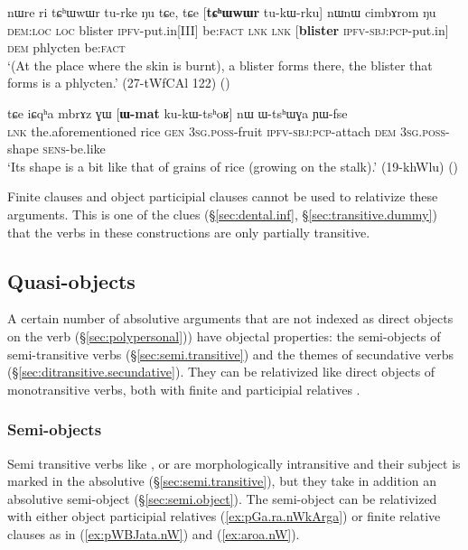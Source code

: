 \begin{exe}
\ex \label{ex:tCHWwWr.turke}
\gll nɯre ri tɕʰɯwɯr tu-rke ŋu tɕe, tɕe [\textbf{tɕʰɯwɯr} tu-kɯ-rku] nɯnɯ cimbɤrom ŋu \\
\textsc{dem}:\textsc{loc} \textsc{loc} blister \textsc{ipfv}-put.in[III] be:\textsc{fact} \textsc{lnk} \textsc{lnk} [\textbf{blister} \textsc{ipfv}-\textsc{sbj}:\textsc{pcp}-put.in] \textsc{dem} phlycten be:\textsc{fact} \\
\glt `(At the place where the skin is burnt), a blister forms there, the blister that forms is a phlycten.' (27-tWfCAl 122)
()
\end{exe} 

\begin{exe}
\ex \label{ex:Wmat.kukWtshoR}
\gll tɕe iɕqʰa mbrɤz ɣɯ [\textbf{ɯ-mat} ku-kɯ-tsʰoʁ] nɯ ɯ-tsʰɯɣa ɲɯ-fse \\
\textsc{lnk} the.aforementioned rice \textsc{gen} \textsc{3sg}.\textsc{poss}-fruit \textsc{ipfv}-\textsc{sbj}:\textsc{pcp}-attach \textsc{dem} \textsc{3sg}.\textsc{poss}-shape \textsc{sens}-be.like \\
\glt `Its shape is a bit like that of grains of rice (growing on the stalk).' (19-khWlu)
()
\end{exe}

Finite clauses and object participial clauses cannot be used to relativize these arguments. This is one of the clues (§\ref{sec:dental.inf}, §\ref{sec:transitive.dummy}) that the verbs in these constructions are only partially transitive.

\subsection{Quasi-objects} \label{sec:semi.object.relativization}
A certain number of absolutive arguments that are not indexed as direct objects on the verb (§\ref{sec:polypersonal})) have objectal properties: the semi-objects of
semi-transitive verbs (§\ref{sec:semi.transitive}) and the themes of secundative verbs (§\ref{sec:ditransitive.secundative}). They can be
relativized like direct objects of monotransitive verbs, both with finite and participial
relatives \citep{jacques16relatives}.


  \subsubsection{Semi-objects}  \label{sec:semi.tr.relativization}
 Semi transitive verbs like ,  or  are morphologically intransitive and their subject is marked in the absolutive (§\ref{sec:semi.transitive}), but they take in addition an absolutive semi-object (§\ref{sec:semi.object}). The semi-object can be relativized with either object participial relatives (\ref{ex:pGa.ra.nWkArga}) or finite relative clauses as in (\ref{ex:pWBJata.nW}) and (\ref{ex:aroa.nW}).
 
